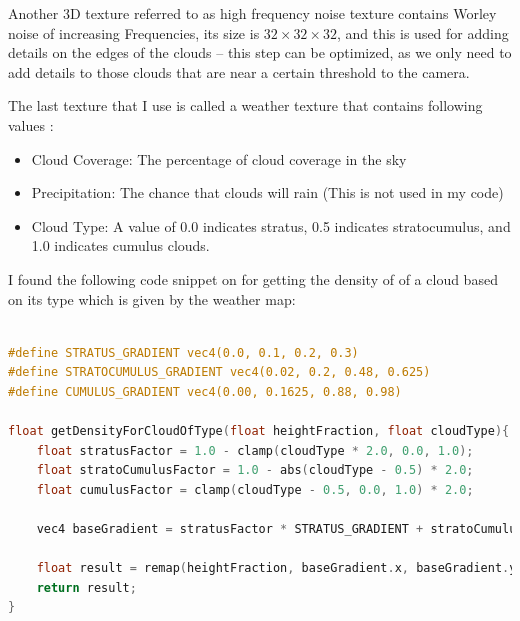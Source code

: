 Another 3D texture referred to as high frequency noise texture contains Worley noise of increasing Frequencies, its size is $32\times32\times32$, and this is used for adding details on the edges of the clouds -- this step can be optimized, as we only need to add details to those clouds that are near a certain threshold to the camera.

The last texture that I use is called a weather texture that contains following values \cite{engel2016gpupro7}:
\begin{itemize}
    \item Cloud Coverage: The percentage of cloud coverage in the sky
    \item Precipitation: The chance that clouds will rain (This is not used in my code)
    \item Cloud Type: A value of 0.0 indicates stratus, 0.5 indicates stratocumulus,
    and 1.0 indicates cumulus clouds. 
\end{itemize}


I found the following code snippet on \cite{gamedevnet2015horizonzerodawn} for getting the density of of a cloud based on its type which is given by the weather map:
\begin{lstlisting}[language=C]

#define STRATUS_GRADIENT vec4(0.0, 0.1, 0.2, 0.3)
#define STRATOCUMULUS_GRADIENT vec4(0.02, 0.2, 0.48, 0.625)
#define CUMULUS_GRADIENT vec4(0.00, 0.1625, 0.88, 0.98)
    
float getDensityForCloudOfType(float heightFraction, float cloudType){
    float stratusFactor = 1.0 - clamp(cloudType * 2.0, 0.0, 1.0);
    float stratoCumulusFactor = 1.0 - abs(cloudType - 0.5) * 2.0;
    float cumulusFactor = clamp(cloudType - 0.5, 0.0, 1.0) * 2.0;

    vec4 baseGradient = stratusFactor * STRATUS_GRADIENT + stratoCumulusFactor * STRATOCUMULUS_GRADIENT + cumulusFactor * CUMULUS_GRADIENT;

    float result = remap(heightFraction, baseGradient.x, baseGradient.y, 0.0, 1.0) * remap(heightFraction, baseGradient.z, baseGradient.w, 1.0, 0.0);
    return result;
}

\end{lstlisting}

